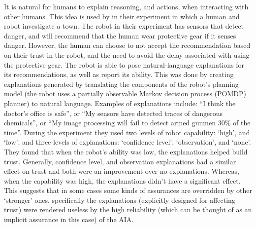 It is natural for humans to explain reasoning, and actions, when interacting with other humans. This idea is used by \citet{Wang2016-id} in their experiment in which a human and robot investigate a town. The robot in their experiment has sensors that detect danger, and will recommend that the human wear protective gear if it senses danger. However, the human can choose to not accept the recommendation based on their trust in the robot, and the need to avoid the delay associated with using the protective gear. The robot is able to pose natural-language explanations for its recommendations, as well as report its ability. This was done by creating explanations generated by translating the components of the robot's planning model (the robot uses a partially observable Markov decision process (POMDP) planner) to natural language. Examples of explanations include: ``I think the doctor's office is safe'', or ``My sensors have detected traces of dangerous chemicals'', or ``My image processing will fail to detect armed gunmen 30\% of the time''. During the experiment they used two levels of robot capability: `high', and `low'; and three levels of explanations: `confidence level', `observation', and `none'. They found that when the robot's ability was low, the explanations helped build trust. Generally, confidence level, and observation explanations had a similar effect on trust and both were an improvement over no explanations. Whereas, when the capability was high, the explanations didn't have a significant effect. This suggests that in some cases some kinds of assurances are overridden by other `stronger' ones, specifically the explanations (explicitly designed for affecting trust) were rendered useless by the high reliability (which can be thought of as an implicit assurance in this case) of the AIA.

